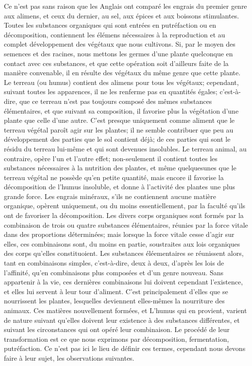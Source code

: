 Ce n'est pas sans raison que les Anglais\setcounter{page}{226} ont comparé les engrais du premier genre aux alimens, et ceux du dernier, au sel, aux épices et aux boissons stimulantes. Toutes les substances organiques qui sont entrées en putréfaction ou en décomposition, contiennent les élémens nécessaires à la reproduction et au complet développement des végétaux que nous cultivons. Si, par le moyen des semences et des racines, nous mettons les germes d'une plante quelconque en contact avec ces substances, et que cette opération soit d'ailleurs faite de la manière convenable, il en résulte des végétaux du même genre que cette plante. Le terreau (ou humus) contient des alimens pour tous les végétaux; cependant, suivant toutes les apparences, il ne les renferme pas en quantités égales; c'est-à-dire, que ce terreau n'est pas toujours composé des mêmes substances élémentaires, et que suivant sa composition, il favorise plus la végétation d'une plante que celle d'une autre. C'est presque uniquement comme aliment que le terreau végétal paroît agir sur les plantes; il ne semble contribuer que peu au développement des parties que le sol contient déjà; de ces parties qui sont le résidu du terreau lui-même et qui sont devenues insolubles. Le terreau animal, au contraire, opère l'un et l'autre effet; non-seulement il\setcounter{page}{227} contient toutes les substances nécessaires à la
nutrition des plantes, et même quelquesunes que le terreau végétal ne possède qu’en
petite quantité, mais encore il favorise la décomposition de l’humus insoluble, et donne
à l’activité des plantes une plus grande force.
Les engrais minéraux, s’ils ne contiennent
aucune matière organique, opèrent uniquement, ou du moins essentiellement, par la
faculté qu’ils ont de favoriser la décomposition.
Les divers corps organiques sont formés
par la combinaison de trois ou quatre substances élémentaires, réunies par la force vitale dans des proportions déterminées; mais
lorsque la force vitale cesse d’agir sur elles,
ces combinaisons sont, du moins en partie,
soustraites aux lois organiques des corps qu’elles constituoient. Les substances éléementaires se réunissent alors, tant en combinaisons
simples, c’est-à-dire, deux à deux, d’après
les lois de l’affinité, qu’en combinaisons plus
composées et d’un genre nouveau. Sans appartenir à la vie, ces dernières combinaisons
lui doivent cependant l’existence, et elles
lui servent à leur tour d’aliment. C’est principalement d’elles que se nourrissent les
plantes, lesquelles deviennent elles-mêmes
la nourriture des animaux.
Ces matières nouvellement formées, et\setcounter{page}{228} L'humus qui en provient, varient de nature suivant qu'elles doivent leur existence à des substances différentes, et suivant les circonstances qui ont opéré leur combinaison. Le procédé de leur transformation est ce que nous exprimons par décomposition, fermentation, putréfaction. Ce n'est pas ici le lieu de définir ces termes, cependant nous devons faire à leur sujet, les observations suivantes.
